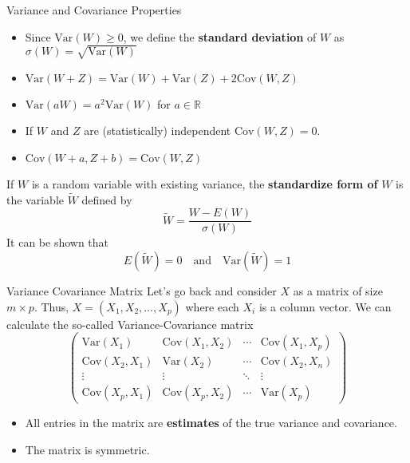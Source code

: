 \documentclass{beamer}
\begin{document}
\begin{frame}{Variance and Covariance Properties}
	\begin{itemize}
		\item Since $\textrm{Var}(W) \ge 0$, we define the {\bf standard deviation} of $W$ as $\sigma(W)=\sqrt{\textrm{Var}(W)}$
		\item $\textrm{Var}(W+Z)= \textrm{Var}(W)+ \textrm{Var}(Z)+2 \textrm{Cov}(W,Z)$
		\item $\textrm{Var}(aW)= a^2 \textrm{Var}(W)$ for $a \in \mathbb{R}$
		\item If $W$ and $Z$ are (statistically) independent $\textrm{Cov}(W,Z)= 0$.
		\item $\textrm{Cov}(W+a,Z+b)= \textrm{Cov}(W,Z)$
	\end{itemize}
	
	If $W$ is a random variable with existing variance, the {\bf standardize form of } $W$ is the variable $\tilde{W}$ defined by 
	\begin{equation*}
		\tilde{W}= \frac{W - E(W)}{\sigma(W)}
	\end{equation*}
It can be shown that
\begin{equation*}
	E(\tilde{W})=0 \quad \textrm{and} \quad \textrm{Var}(\tilde{W})= 1
\end{equation*}
\end{frame}

\begin{frame}{Variance Covariance Matrix}
	Let's go back and consider $X$ as a matrix of size $m \times p$.
	Thus, $X=(X_1, X_2, \ldots, X_p)$ where each $X_i$ is a column vector. We can calculate the so-called Variance-Covariance matrix
	\begin{equation*}
		\begin{pmatrix}
			\textrm{Var}(X_1) & \textrm{Cov}(X_1,X_2) & \cdots & \textrm{Cov}(X_1,X_p) \\
			\textrm{Cov}(X_2,X_1) & \textrm{Var}(X_2) & \cdots & \textrm{Cov}(X_2,X_n) \\
			\vdots & \vdots & \ddots & \vdots\\
			\textrm{Cov}(X_p,X_1) & \textrm{Cov}(X_p,X_2) & \cdots & \textrm{Var}(X_p)
		\end{pmatrix}
	\end{equation*}

\begin{itemize}
	\item All entries in the matrix are {\bf estimates} of the true variance and covariance.
	\item The matrix is symmetric.
\end{itemize} 

\end{frame}
\end{document}
